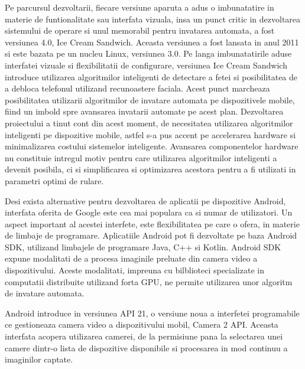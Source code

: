 	Pe parcursul dezvoltarii, fiecare versiune aparuta a adus o imbunatatire in materie de funtionalitate sau interfata vizuala, insa un punct critic in dezvoltarea sistemului de operare si unul memorabil pentru invatarea automata, a fost versiunea 4.0, Ice Cream Sandwich. Aceasta versiunea a fost lansata in anul 2011 si este bazata pe un nucleu Linux, versiunea 3.0. Pe langa imbunatatirile aduse interfatei vizuale si flexibilitatii de configurare, versiunea Ice Cream Sandwich introduce utilizarea algoritmilor inteligenti de detectare a fetei si posibilitatea de a debloca telefonul utilizand recunoastere faciala. 	
	Acest punct marcheaza posibilitatea utilizarii algoritmilor de invatare automata pe dispozitivele mobile, fiind un imbold spre avansarea invatarii automate pe acest plan. Dezvoltarea proiectului a tinut cont din acest moment, de necesitatea utilizarea algoritmilor inteligenti pe dispozitive mobile, astfel s-a pus accent pe accelerarea hardware si minimalizarea costului sistemelor inteligente. Avansarea componentelor hardware nu constituie intregul motiv pentru care utilizarea algoritmilor inteligenti a devenit posibila, ci si simplificarea si optimizarea acestora pentru a fi utilizati in parametri optimi de rulare.
	\newline
	
	Desi exista alternative pentru dezvoltarea de aplicatii pe dispozitive Android, interfata oferita de Google este cea mai populara ca si numar de utilizatori. Un aspect important al acestei interfete, este flexibilitatea pe care o ofera, in materie de limbaje de programare. Aplicatiile Android pot fi dezvoltate pe baza Android SDK, utilizand limbajele de programare Java, C++ si Kotlin. \cite{android}	
	Android SDK expune modalitati de a procesa imaginile preluate din camera video a dispozitivului. Aceste modalitati, impreuna cu bilblioteci specializate in computatii distribuite utilizand forta GPU, ne permite utilizarea unor algoritm de invatare automata. 
	
	Android introduce in versiunea API 21, o versiune noua a interfetei programabile ce gestioneaza camera video a dispozitivului mobil, Camera 2 API. Aceasta interfata acopera utilizarea camerei, de la permisiune pana la selectarea unei camere dintr-o lista de dispozitive disponibile si procesarea in mod continuu a imaginilor captate.
	
	
